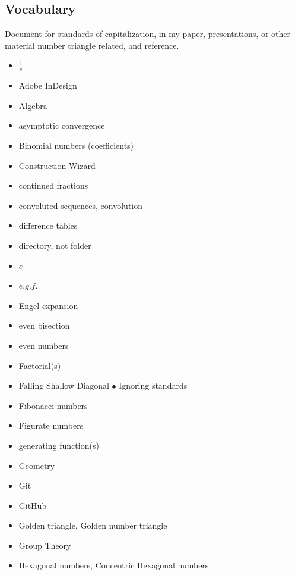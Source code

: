 \documentclass[12pt]{article}
\begin{document}
     
    \twocolumn
     
    \subsection{Vocabulary}
    \label{sec:19}   

    Document for standards of capitalization, in my paper, presentations, or other material 
    number triangle related, and reference.
        
    \begin{itemize}
        \item $ \frac{1}{e} $
        \item Adobe InDesign
        \item Algebra
        \item asymptotic convergence
        \item Binomial numbers (coefficients)
        
        \item Construction Wizard
        \item continued fractions
        \item convoluted sequences, convolution
        \item difference tables
        
        \item directory, not folder
        \item $ e $
        \item $ e.g.f. $
        \item Engel expansion
        \item even bisection
        
        \item even numbers
        \item Factorial(s)
        \item Falling Shallow Diagonal $ \bullet $ Ignoring standards
        \item Fibonacci numbers
        
        \item Figurate numbers
        \item generating function(s)
        \item Geometry
        \item Git
        
        \item GitHub
        \item Golden triangle, Golden number triangle
        \item Group Theory
        \item Hexagonal numbers, Concentric Hexagonal numbers
        

\end{itemize}
\end{document}

